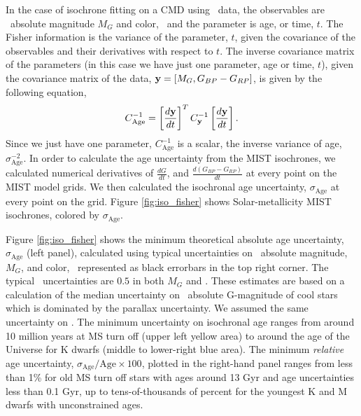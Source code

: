 In the case of isochrone fitting on a CMD using \Gaia\ data, the observables
are \Gaia\ absolute magnitude $M_G$ and color, \gcolor\ and the parameter is
age, or time, $t$.
The Fisher information is the variance of the parameter, $t$, given the
covariance of the observables and their derivatives with respect to $t$.
The inverse covariance matrix of the parameters (in this case we have just one
parameter, age or time, $t$), given the covariance matrix of the data,
${\bf y} = [M_G, G_{BP} - G_{RP}]$, is given by the following equation,
\begin{equation}
    C_{\mathrm{Age}}^{-1} = \left[\frac{d{\bf y}}{dt}\right]^T
    C_{\bf y}^{-1} \left[\frac{d{\bf y}}{dt}\right].
\end{equation}
Since we just have one parameter, $C_\mathrm{Age}^{-1}$ is a scalar, the
inverse variance of age, $\sigma_{\mathrm{Age}}^{-2}$.
In order to calculate the age uncertainty from the MIST isochrones, we
calculated numerical derivatives of $\frac{dG}{dt}$,
and $\frac{d(G_{BP} - G_{RP})}{dt}$ at every point on the MIST model grids.
We then calculated the isochronal age uncertainty, $\sigma_{\mathrm{Age}}$ at
every point on the grid.
Figure \ref{fig:iso_fisher} shows Solar-metallicity MIST isochrones, colored
by $\sigma_{\mathrm{Age}}$.

Figure \ref{fig:iso_fisher} shows the minimum theoretical absolute age
uncertainty, $\sigma_{\mathrm{Age}}$ (left panel), calculated using typical
uncertainties on \Gaia\ absolute magnitude, $M_G$, and color, \gcolor\,
represented as black errorbars in the top right corner.
The typical \Gaia\ uncertainties are $0.5$ in both $M_G$ and \gcolor.
These estimates are based on a calculation of the median uncertainty on \Gaia\
absolute G-magnitude of cool stars which is dominated by the parallax
uncertainty.
We assumed the same uncertainty on \gcolor.
The minimum uncertainty on isochronal age ranges from around 10 million years
at MS turn off (upper left yellow area) to around the age of the Universe for
K dwarfs (middle to lower-right blue area).
The minimum {\it relative} age uncertainty,
$\sigma_{\mathrm{Age}}/\mathrm{Age} \times 100$, plotted in the right-hand
panel ranges from less than 1\% for old MS turn off stars with ages
around 13 Gyr and age uncertainties less than 0.1 Gyr, up to tens-of-thousands
of percent for the youngest K and M dwarfs with unconstrained ages.

